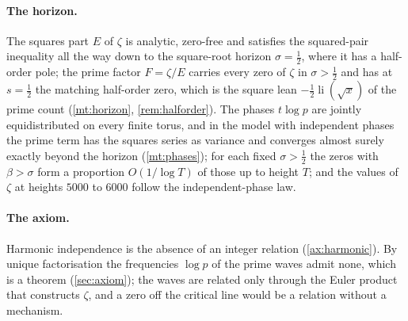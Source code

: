 \documentclass[11pt]{article}
\theoremstyle{definition}\newtheorem{definition}[theorem]{Definition}
\theoremstyle{remark}\newtheorem{remark}[theorem]{Remark}
\theoremstyle{definition}\newtheorem{axiom}{Axiom}
\newcommand{\li}{\operatorname{li}}\newcommand{\Tr}{\operatorname{Tr}}
\begin{document}
\paragraph{The horizon.} The squares part $E$ of $\zeta$ is analytic, zero-free and satisfies the squared-pair inequality all the way down to the square-root horizon $\sigma=\frac12$, where it has a half-order pole; the prime factor $F=\zeta/E$ carries every zero of $\zeta$ in $\sigma>\frac12$ and has at $s=\frac12$ the matching half-order zero, which is the square lean $-\frac12\li(\sqrt x)$ of the prime count (\cref{mt:horizon}, \cref{rem:halforder}). The phases $t\log p$ are jointly equidistributed on every finite torus, and in the model with independent phases the prime term has the squares series as variance and converges almost surely exactly beyond the horizon (\cref{mt:phases}); for each fixed $\sigma>\frac12$ the zeros with $\beta>\sigma$ form a proportion $O(1/\log T)$ of those up to height $T$; and the values of $\zeta$ at heights $5000$ to $6000$ follow the independent-phase law.

\paragraph{The axiom.} Harmonic independence is the absence of an integer relation (\cref{ax:harmonic}). By unique factorisation the frequencies $\log p$ of the prime waves admit none, which is a theorem (\cref{sec:axiom}); the waves are related only through the Euler product that constructs $\zeta$, and a zero off the critical line would be a relation without a mechanism.
\end{document}
